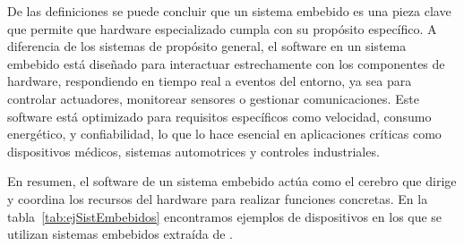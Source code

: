 De las definiciones se puede concluir que un sistema embebido es una pieza clave que permite que hardware especializado cumpla con su propósito específico. A diferencia de los sistemas de propósito general, el software en un sistema embebido está diseñado para interactuar estrechamente con los componentes de hardware, respondiendo en tiempo real a eventos del entorno, ya sea para controlar actuadores, monitorear sensores o gestionar comunicaciones. Este software está optimizado para requisitos específicos como velocidad, consumo energético, y confiabilidad, lo que lo hace esencial en aplicaciones críticas como dispositivos médicos, sistemas automotrices y controles industriales.
	
En resumen, el software de un sistema embebido actúa como el cerebro que dirige y coordina los recursos del hardware para realizar funciones concretas. En la tabla~\ref{tab:ejSistEmbebidos} encontramos ejemplos de dispositivos en los que se utilizan sistemas embebidos extraída de \cite{noergaard2005embedded}.

